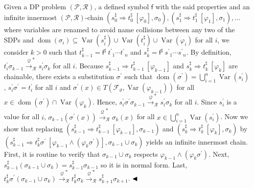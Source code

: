 \documentclass[10pt,a4paper]{amsart}
\begin{document}
 
Given a DP problem $(\mathcal{P},\mathcal{R})$, a defined symbol $\mathsf{f}$ with the said properties and an infinite innermost $(\mathcal{P},\mathcal{R})$-chain $({s_{0}^{\sharp}}\Rightarrow{t_{0}^{\sharp}}\ [\varphi_{0}],\sigma_{0}),({s_{1}^{\sharp}}\Rightarrow{t_{1}^{\sharp}}\ [\varphi_{1}],\sigma_{1}),\ldots$ where variables are renamed to avoid name collisions between any two of the SDPs and $\operatorname{dom}(\sigma_{i})\subseteq\operatorname{Var}(s_{i}^{\sharp})\cup\operatorname{Var}(t_{i}^{\sharp})\cup\operatorname{Var}(\varphi_{i})$ for all $i$, we consider $k>0$ such that $t_{k-1}^{\sharp}={\mathsf{f}^{\sharp}}\ {{t^{\prime}}_{1}\cdots{t^{\prime}}_{n}}$ and $s_{k}^{\sharp}={\mathsf{f}^{\sharp}}\ {{s^{\prime}}_{1}\cdots{s^{\prime}}_{n}}$. By definition, $t^{\prime}_{i}\sigma_{k-1}\xrightarrow{\scriptscriptstyle\mathcal{Q}}_{\mathcal{R}}^{*}s^{\prime}_{i}\sigma_{k}$ for all $i$. Because ${s_{k-1}^{\sharp}}\Rightarrow{t_{k-1}^{\sharp}}\ [\varphi_{k-1}]$ and ${s_{k}^{\sharp}}\Rightarrow{t_{k}^{\sharp}}\ [\varphi_{k}]$ are chainable, there exists a substitution $\sigma^{\prime}$ such that $\operatorname{dom}(\sigma^{\prime})=\bigcup_{i=1}^{n}\operatorname{Var}(s^{\prime}_{i})$, $s^{\prime}_{i}\sigma^{\prime}=t^{\prime}_{i}$ for all $i$ and $\sigma^{\prime}(x)\in T({\mathcal{F}}_{\vartheta},\operatorname{Var}(\varphi_{k-1}))$ for all $x\in\operatorname{dom}(\sigma^{\prime})\cap\operatorname{Var}(\varphi_{k})$. Hence, $s^{\prime}_{i}\sigma^{\prime}\sigma_{k-1}\xrightarrow{\scriptscriptstyle\mathcal{Q}}_{\mathcal{R}}^{*}s^{\prime}_{i}\sigma_{k}$ for all $i$. Since $s^{\prime}_{i}$ is a value for all $i$, $\sigma_{k-1}(\sigma^{\prime}(x))\xrightarrow{\scriptscriptstyle\mathcal{Q}}_{\mathcal{R}}^{*}\sigma_{k}(x)$ for all $x\in\bigcup_{i=1}^{n}\operatorname{Var}(s^{\prime}_{i})$. Now we show that replacing $({s_{k-1}^{\sharp}}\Rightarrow{t_{k-1}^{\sharp}}\ [\varphi_{k-1}],\sigma_{k-1})$ and $({s_{k}^{\sharp}}\Rightarrow{t_{k}^{\sharp}}\ [\varphi_{k}],\sigma_{k})$ by $({s_{k-1}^{\sharp}}\Rightarrow{t_{k}^{\sharp}\sigma^{\prime}}\ [\varphi_{k-1}\wedge(\varphi_{k}\sigma^{\prime})],\sigma_{k-1}\cup\sigma_{k})$ yields an infinite innermost chain. First, it is routine to verify that $\sigma_{k-1}\cup\sigma_{k}$ respects $\varphi_{k-1}\wedge(\varphi_{k}\sigma^{\prime})$. Next, $s_{k-1}^{\sharp}(\sigma_{k-1}\cup\sigma_{k})=s_{k-1}^{\sharp}\sigma_{k-1}$ so it is in normal form. Last, $t_{k}^{\sharp}\sigma^{\prime}(\sigma_{k-1}\cup\sigma_{k})\xrightarrow{\scriptscriptstyle\mathcal{Q}}_{\mathcal{R}}^{*}t_{k}^{\sharp}\sigma_{k}\xrightarrow{\scriptscriptstyle\mathcal{Q}}_{\mathcal{R}}^{*}s_{k+1}^{\sharp}\sigma_{k+1}$. $\hfill\blacktriangleleft$\par
 
\end{document}
